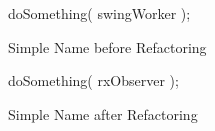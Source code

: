 \begin{figure}[H]
\begin{minipage}{0.48\textwidth}
\begin{sourcecode}
\begin{javacode}{}
doSomething( swingWorker );
\end{javacode}
\caption{Simple Name before Refactoring}
\label{code:sn-before}
\end{sourcecode}
\end{minipage}\hspace{0.7cm}
\begin{minipage}{0.48\textwidth}
\begin{sourcecode}
\begin{javacode}{}
doSomething( rxObserver );
\end{javacode}
\caption{Simple Name after Refactoring}
\label{code:sn-after}
\end{sourcecode}
\end{minipage}
\end{figure}